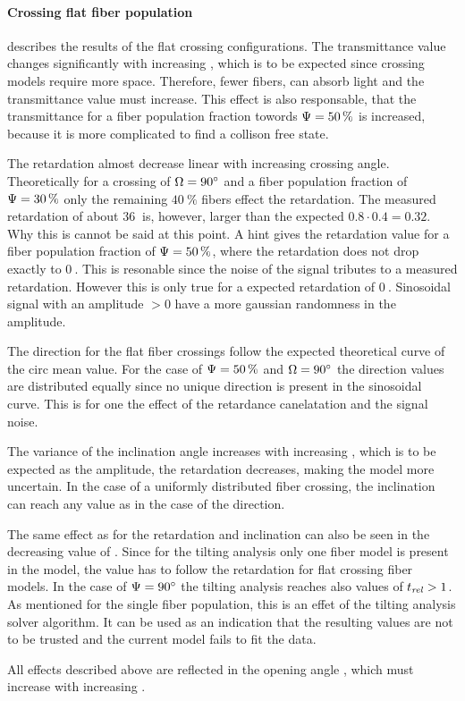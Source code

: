 \paragraph{Crossing flat fiber population}
 describes the results of the flat crossing configurations.
The transmittance value changes significantly with increasing \modelOmega{}, which is to be expected since crossing models require more space.
Therefore, fewer fibers, can absorb light and the transmittance value must increase.
This effect is also responsable, that the transmittance for a fiber population fraction towords $\textnormal{$\Psi$}=\SI{50}{\percent}$ is increased, because it is more complicated to find a collison free state.
\par
%
The retardation almost decrease linear with increasing crossing angle.
Theoretically for a crossing of $\textnormal{$\Omega$}=\SI{90}{\degree}$ and a fiber population fraction of $\textnormal{$\Psi$}=\SI{30}{\percent}$ only the remaining $\SI{40}{\percent}$ fibers effect the retardation.
The measured retardation of about $\SI{36}{}$ is, however, larger than the expected $0.8\cdot 0.4 = 0.32$.
Why this is cannot be said at this point.
A hint gives the retardation value for a fiber population fraction of $\textnormal{$\Psi$}=\SI{50}{\percent}$, where the retardation does not drop exactly to $\SI{0}{}$.
This is resonable since the noise of the signal tributes to a measured retardation.
However this is only true for a expected retardation of $\SI{0}{}$.
Sinosoidal signal with an amplitude $>0$ have a more gaussian randomness in the amplitude.
\par
%
The direction for the flat fiber crossings follow the expected theoretical curve of the circ mean value.
For the case of $\textnormal{$\Psi$}=\SI{50}{\percent}$ and $\textnormal{$\Omega$}=\SI{90}{\degree}$ the direction values are distributed equally since no unique direction is present in the sinosoidal curve.
This is for one the effect of the retardance canelatation and the signal noise.
\par
%
The variance of the inclination angle increases with increasing \modelOmega{}, which is to be expected as the amplitude, \ie{} the retardation decreases, making the model more uncertain.
In the case of a uniformly distributed fiber crossing, the inclination can reach any value as in the case of the direction.
\par
%
The same effect as for the retardation and inclination can also be seen in the decreasing value of \trel{}.
Since for the tilting analysis only one fiber model is present in the model, the \trel{} value has to follow the retardation for flat crossing fiber models.
In the case of $\textnormal{$\Psi$}=\SI{90}{\degree}$ the tilting analysis reaches also values of $\textnormal{$t_\mathit{rel}$}>1$.
As mentioned for the single fiber population, this is an effet of the tilting analysis solver algorithm.
It can be used as an indication that the resulting values are not to be trusted and the current model fails to fit the data.
\par
%
All effects described above are reflected in the opening angle \openingAngle{}, which must increase with increasing \modelOmega{} .
%
%
%
